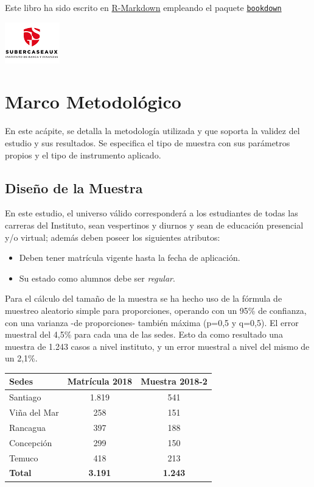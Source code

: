 \documentclass[]{book}
\providecommand{\tightlist}{%
  \setlength{\itemsep}{0pt}\setlength{\parskip}{0pt}}
\begin{document}
Este libro ha sido escrito en
\href{http://rmarkdown.rstudio.com}{R-Markdown} empleando el paquete
\href{https://bookdown.org/yihui/bookdown/}{\texttt{bookdown}}

\begin{flushleft}\includegraphics{images/IconoIGS} \end{flushleft}

\chapter{Marco Metodológico}\label{intro}

En este acápite, se detalla la metodología utilizada y que soporta la
validez del estudio y sus resultados. Se especifica el tipo de muestra
con sus parámetros propios y el tipo de instrumento aplicado.

\section{Diseño de la Muestra}\label{requisitos}

En este estudio, el universo válido corresponderá a los estudiantes de
todas las carreras del Instituto, sean vespertinos y diurnos y sean de
educación presencial y/o virtual; además deben poseer los siguientes
atributos:

\begin{itemize}
\tightlist
\item
  Deben tener matrícula vigente hasta la fecha de aplicación.
\item
  Su estado como alumnos debe ser \emph{regular}.
\end{itemize}

Para el cálculo del tamaño de la muestra se ha hecho uso de la fórmula
de muestreo aleatorio simple para proporciones, operando con un 95\% de
confianza, con una varianza -de proporciones- también máxima (p=0,5 y
q=0,5). El error muestral del 4,5\% para cada una de las sedes. Esto da
como resultado una muestra de 1.243 casos a nivel instituto, y un error
muestral a nivel del mismo de un 2,1\%.

\begin{longtable}[]{@{}lcc@{}}
\toprule
Sedes & Matrícula 2018 & Muestra 2018-2\tabularnewline
\midrule
\endhead
Santiago & 1.819 & 541\tabularnewline
Viña del Mar & 258 & 151\tabularnewline
Rancagua & 397 & 188\tabularnewline
Concepción & 299 & 150\tabularnewline
Temuco & 418 & 213\tabularnewline
\textbf{Total} & \textbf{3.191} & \textbf{1.243}\tabularnewline
\bottomrule
\end{longtable}
\end{document}
